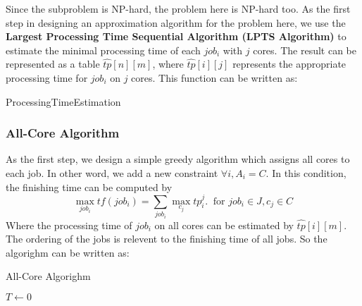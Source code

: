 \documentclass{llncs}
\begin{document}
  Since the subproblem is NP-hard, the problem here is NP-hard too. As the first step in designing an approximation algorithm for the problem here, we use the \textbf{Largest Processing Time Sequential Algorithm (LPTS Algorithm)} to estimate the minimal processing time of each $job_i$ with $j$ cores. The result can be represented as a table $\hat{tp}[n][m]$, where $\hat{tp}[i][j]$ represents the appropriate processing time for $job_i$ on $j$ cores. This function can be written as:\\
  \begin{minipage}[t]{0.9\textwidth}
    \begin{algorithm}[H]
      \BlankLine
      \caption{ProcessingTimeEstimation}\label{Alg_1}
      \BlankLine
    \end{algorithm}
  \end{minipage}
\subsubsection{All-Core Algorithm}
  As the first step, we design a simple greedy algorithm which assigns all cores to each job. In other word, we add a new constraint $ \forall i, A_i = C$.  In this condition, the finishing time can be computed by
  $$\max_{job_i} tf(job_i) = \sum_{job_i} \max_{c_j}{tp_i^j}.  \ \text{ for } job_i \in J, c_j \in C $$
  Where the processing time of $job_i$ on all cores can be estimated by $\hat{tp}[i][m]$. The ordering of the jobs is relevent to the finishing time of all jobs. So the algorighm can be written as:\\
            \begin{minipage}[t]{0.9\textwidth}
            \begin{algorithm}[H]
              \BlankLine
              \caption{All-Core Algorighm}\label{Alg_1}
              \BlankLine
              $T \leftarrow 0$\;
             \end{algorithm}
             \end{minipage}\\
\end{document}

